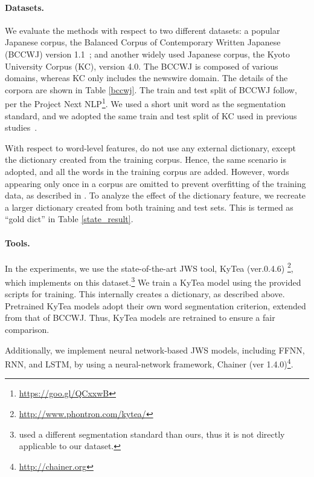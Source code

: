 \documentclass[11pt]{article}
\begin{document}
\paragraph{Datasets.}
We evaluate the methods with respect to two different datasets: a
popular Japanese corpus, the Balanced Corpus of Contemporary Written
Japanese (BCCWJ) version 1.1~\cite{maekawa2014balanced};
and another widely used Japanese corpus, the Kyoto University Corpus (KC),
version 4.0.
The BCCWJ is composed of various domains, whereas KC only includes the
newswire domain. The details of the corpora are shown in Table \ref{bccwj}.
The train and test split of BCCWJ follow, per the Project Next
NLP\footnote{\url{https://goo.gl/QCxxwB}}. We used a short unit word as
the segmentation standard, and we adopted the same train and test split of KC used in previous
studies~\cite{kudo-yamamoto-matsumoto:2004:EMNLP,uchimoto2001unknown}.

With respect to word-level features,
 do not use any external
dictionary, except the dictionary created from the training corpus. Hence, the
same scenario is adopted, and all the words in the training corpus are added.
However, words appearing only once in a corpus are omitted to prevent
overfitting of the training data, as
described in \cite{neubig-nakata-mori:2011:ACL-HLT2011}.
To analyze the effect of the dictionary feature, we recreate a larger
dictionary created from both training and test sets. This is termed as ``gold
dict'' in Table \ref{state_result}.


\paragraph{Tools.}
In the experiments, we use the state-of-the-art JWS tool, KyTea (ver.0.4.6)
\footnote{\url{http://www.phontron.com/kytea/}}, which implements
\cite{neubig-nakata-mori:2011:ACL-HLT2011} on this
dataset.\footnote{
used a different segmentation standard than ours, thus it is not directly
applicable to our dataset.}
We train a KyTea model using the provided scripts for training. This
internally creates a dictionary, as described above. Pretrained KyTea models
adopt their own word segmentation criterion, extended from that of BCCWJ.
Thus, KyTea models are retrained to ensure a fair comparison.

Additionally, we implement neural network-based JWS models, including FFNN,
RNN, and LSTM, by using a neural-network framework, Chainer (ver
1.4.0)\footnote{\url{http://chainer.org}}\cite{chainerlearningsys2015}.
\end{document}
